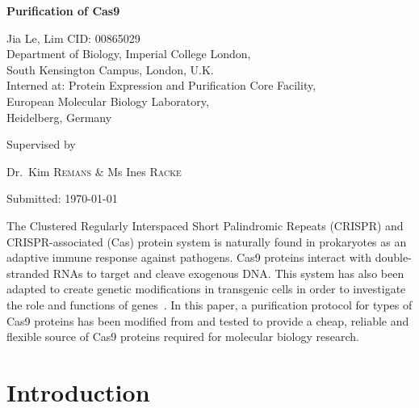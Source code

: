 \documentclass[11pt]{article}
\renewenvironment{abstract}
 {\hspace{.8cm}
  {\bfseries\Large\abstractname}
  \list{}{
    \setlength{\leftmargin}{.95cm}%
    \setlength{\rightmargin}{\leftmargin}%
  }%
  \item\relax}
 {\endlist}
\begin{document}
\begin{titlepage}
	\centering
	\vspace*{\fill}
	{\huge\bfseries Purification of Cas9\par}
	\vspace{2cm}
	{\Large Jia Le, Lim {    }  CID: 00865029}
	\\ 	\vspace{0.5cm}
	{Department of Biology, Imperial College London, \\South Kensington Campus, London, U.K.} \\ \vspace{0.5cm}
	{Interned at: Protein Expression and Purification Core Facility, \\European Molecular Biology Laboratory,\\ Heidelberg, Germany} \\
	\vspace*{\fill}
	{\large Supervised by\par
	Dr.~Kim \textsc{Remans} \& Ms Ines \textsc{Racke} }
	\vfill
	{\large Submitted: \today\par}
\end{titlepage}

\vspace*{\fill}
\tableofcontents 
\vspace*{\fill} 
\thispagestyle{empty}

\doublespacing

\newpage
{}
\vspace*{\fill}
\begin{abstract}  
\doublespacing
The Clustered Regularly Interspaced Short Palindromic Repeats (CRISPR) and CRISPR-associated (Cas) protein system is naturally found in prokaryotes as an adaptive immune response against pathogens. Cas9 proteins interact with double-stranded RNAs to target and cleave exogenous DNA. This system has also been adapted to create genetic modifications in transgenic cells in order to investigate the role and functions of genes~\citep{Jiang2015, Sternberg2015}. In this paper, a purification protocol for types of Cas9 proteins has been modified from \cite{Jinek2012a} and tested to provide a cheap, reliable and flexible source of Cas9 proteins required for molecular biology research. 

\end{abstract}
\vfill


\newpage
{}
\section{Introduction} 
\end{document}
